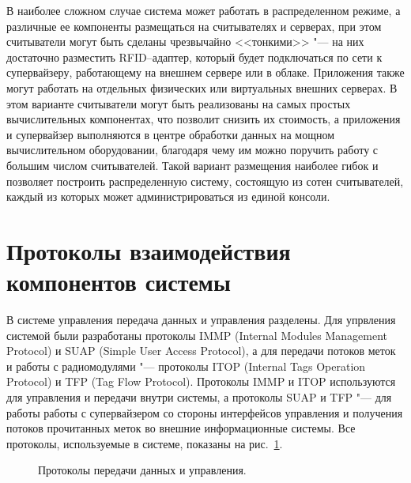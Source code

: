 В наиболее сложном случае система может работать в распределенном режиме, а различные ее компоненты размещаться на считывателях и серверах, при этом считыватели могут быть сделаны чрезвычайно <<тонкими>> "--- на них достаточно разместить RFID--адаптер, который будет подключаться по сети к супервайзеру, работающему на внешнем сервере или в облаке. Приложения также могут работать на отдельных физических или виртуальных внешних серверах. В этом варианте считыватели могут быть реализованы на самых простых вычислительных компонентах, что позволит снизить их стоимость, а приложения и супервайзер выполняются в центре обработки данных на мощном вычислительном оборудовании, благодаря чему им можно поручить работу с большим числом считывателей. Такой вариант размещения наиболее гибок и позволяет построить распределенную систему, состоящую из сотен считывателей, каждый из которых может администрироваться из единой консоли.



\section{Протоколы взаимодействия компонентов системы}\label{sec:ch5_protocols}

В системе управления передача данных и управления разделены. Для упрвления системой были разработаны протоколы IMMP (Internal Modules Management Protocol) и SUAP (Simple User Access Protocol), а для передачи потоков меток и работы с радиомодулями "--- протоколы ITOP (Internal Tags Operation Protocol) и TFP (Tag Flow Protocol). Протоколы IMMP и ITOP используются для управления и передачи внутри системы, а протоколы SUAP и TFP "--- для работы работы с супервайзером со стороны интерфейсов управления и получения потоков прочитанных меток во внешние информационные системы. Все протоколы, используемые в системе, показаны на рис.~\ref{fig:ch5_protocols}.

\begin{figure}[ht]
  \caption{Протоколы передачи данных и управления.}
  \label{fig:ch5_protocols}
\end{figure}

